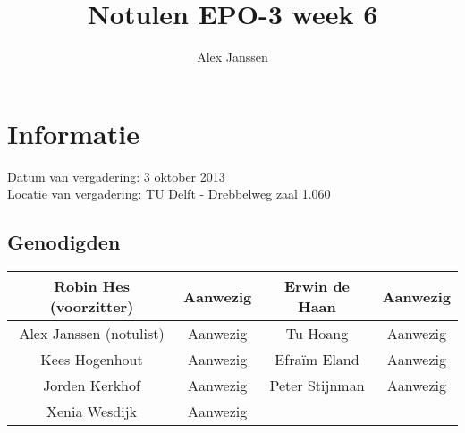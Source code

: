 \documentclass{article}
\begin{document}
\title{Notulen EPO-3 week 6 }%
\author{Alex Janssen}%
\maketitle

\section*{Informatie}
Datum van vergadering: 3 oktober 2013\\  %
Locatie van vergadering: TU Delft - Drebbelweg zaal 1.060 %
\subsection*{Genodigden}
\begin{center}
\begin{tabular}{|c |c | c| c|}
	\hline
Robin Hes (voorzitter) & Aanwezig & Erwin de Haan & Aanwezig \\
	\hline
Alex Janssen (notulist) & Aanwezig & Tu Hoang & Aanwezig \\
	\hline
Kees Hogenhout & Aanwezig & Efraïm Eland & Aanwezig\\
	\hline
Jorden Kerkhof & Aanwezig & Peter Stijnman & Aanwezig \\
	\hline
Xenia Wesdijk & Aanwezig & & \\
	\hline
\end{tabular}
\end{center}
\end{document}
